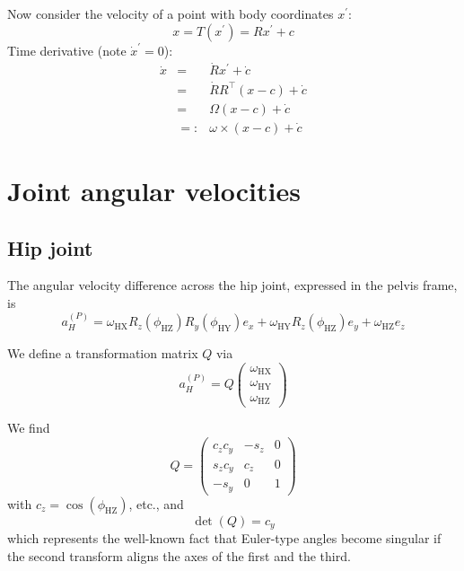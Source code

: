 \documentclass[a4paper]{article}
\begin{document}
Now consider the velocity of a point with body coordinates $x^\prime$:
\begin{equation}
x = T(x^\prime) = R x^\prime + c
\end{equation}
Time derivative (note $\dot{x}^\prime = 0$):
\begin{eqnarray}
\dot{x} &=& \dot{R} x^\prime + \dot{c}\\
&=& \dot{R}R^\top(x - c) + \dot{c}\\
&=& \Omega (x - c) + \dot{c}\\
&=:& \omega \times (x - c) + \dot{c}
\end{eqnarray}

\section{Joint angular velocities}
\subsection{Hip joint}
The angular velocity difference across the hip joint, expressed in the pelvis frame, is
\begin{equation}
a_H^{(P)} = \omega_\mathrm{HX} R_z(\phi_\mathrm{HZ}) R_y(\phi_\mathrm{HY}) e_x
+ \omega_\mathrm{HY} R_z(\phi_\mathrm{HZ}) e_y
+ \omega_\mathrm{HZ} e_z
\end{equation}

We define a transformation matrix $Q$ via
\begin{equation}
\label{eqn:qdef}
a_H^{(P)} = Q \left(\begin{array}{c}
\omega_\mathrm{HX} \\ \omega_\mathrm{HY} \\ \omega_\mathrm{HZ}
\end{array}\right)
\end{equation}

We find
\begin{equation}
Q = \left(\begin{array}{ccc}
c_z c_y & -s_z & 0\\
s_z c_y & c_z  & 0\\
-s_y    & 0    & 1
\end{array}\right)
\end{equation}
with $c_z = \cos(\phi_\mathrm{HZ})$, etc., and
\begin{equation}
\det(Q) = c_y
\end{equation}
which represents the well-known fact that Euler-type angles become singular if the second transform aligns the axes of the first and the third.
\end{document}
